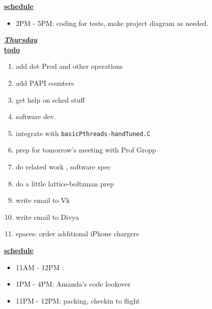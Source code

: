 \underline{\textbf{schedule}}\\
\begin{itemize}
\item 2PM - 5PM: coding for tests, make project diagram as needed.
\end{itemize}

\underline{\textbf{\textit{Thursday}}}\\
\underline{\textbf{todo}}\\
\begin{enumerate}
\item add dot Prod and other operations   

\item add PAPI counters 
\item get help on sched stuff 
\item software dev. 
\item integrate with \texttt{basicPthreads-handTuned.C}

\item prep for tomorrow's meeting with Prof Gropp 
\item do related work ,  software spec   

\item do a little lattice-boltzman prep  


\item write email to Vk  
\item write email to Divya  

\item spaces: order additional iPhone chargers  

\end{enumerate}


\underline{\textbf{schedule}}\\
\begin{itemize}
\item 11AM - 12PM :
\item 1PM - 4PM: Amanda's code lookover
\item 11PM - 12PM: packing, checkin to flight
\end{itemize}

